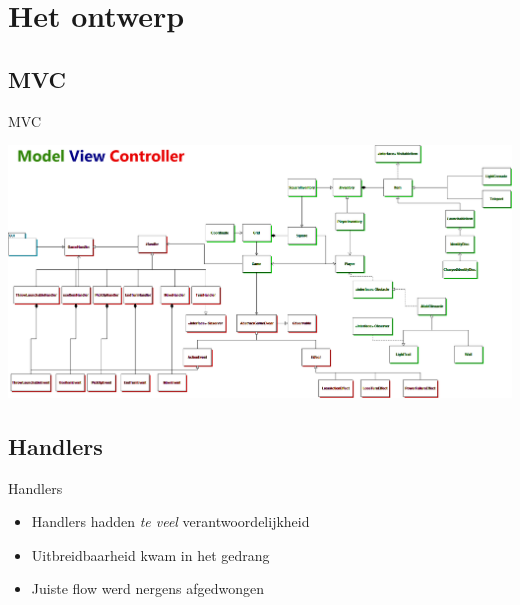 \documentclass[t]{beamer}
\begin{document}
\section{Het ontwerp}
\subsection{MVC}

\begin{frame}{MVC}
\begin{center}
\includegraphics[width=0.9\linewidth]{images/overview}
\end{center}
\end{frame}

\subsection{Handlers}
\begin{frame}{Handlers}
\begin{center}
\end{center}
\begin{itemize}
	\item Handlers hadden \textit{te veel} verantwoordelijkheid
	\item Uitbreidbaarheid kwam in het gedrang
	\item Juiste flow werd nergens afgedwongen
\end{itemize}
\end{frame}
\end{document}
